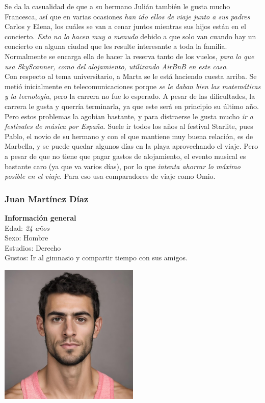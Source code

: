 Se da la casualidad de que a su hermano Julián también le gusta mucho Francesca, así que en varias ocasiones \textit{han ido ellos de viaje junto a sus padres} Carlos y Elena, los cuáles se van a cenar juntos mientras sus hijos están en el concierto. \textit{Esto no lo hacen muy a menudo} debido a que solo van cuando hay un concierto en alguna ciudad que les resulte interesante a toda la familia. Normalmente se encarga ella de hacer la reserva tanto de los vuelos, \textit{para lo que usa SkyScanner, como del alojamiento, utilizando AirBnB en este caso}. \\

Con respecto al tema universitario, a Marta se le está haciendo cuesta arriba. Se metió inicialmente en telecomunicaciones porque \textit{se le daban bien las matemáticas y la tecnología}, pero la carrera no fue lo esperado. A pesar de las dificultades, la carrera le gusta y querría terminarla, ya que este será en principio su último año. Pero estos problemas la agobian bastante, y para distraerse le gusta mucho \textit{ir a festivales de música por España}. Suele ir todos los años al festival Starlite, pues Pablo, el novio de su hermano y con el que mantiene muy buena relación, es de Marbella, y se puede quedar algunos días en la playa aprovechando el viaje. Pero a pesar de que no tiene que pagar gastos de alojamiento, el evento musical es bastante caro (ya que va varios días), por lo que \textit{intenta ahorrar lo máximo posible en el viaje}. Para eso usa comparadores de viaje como Omio.

\subsubsection{Juan Martínez Díaz}

\begin{minipage}{0.4\textwidth}
    \textbf{Información general} \\

    Edad: \textit{24 años} \\
    Sexo: Hombre \\
    Estudios: Derecho \\
    Gustos: Ir al gimnasio y compartir tiempo con sus amigos. \\
\end{minipage}
\hfill
\begin{minipage}{0.4\textwidth}
    \includegraphics[width=0.5\textwidth]{Imagenes/Personas/Juan.jpg}
\end{minipage}

